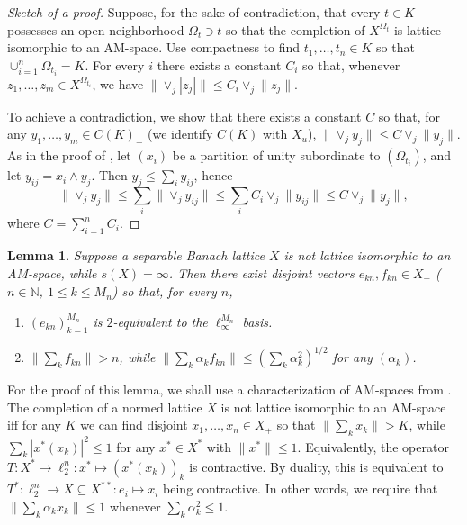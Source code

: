 \documentclass[12pt,leqno]{amsart}
\newtheorem{lemma}[theorem]{Lemma}
\numberwithin{equation}{section}
\theoremstyle{definition}
\def\N{{\mathbb N}}
\begin{document}
\begin{proof}[Sketch of a proof]
Suppose, for the sake of contradiction, that every $t \in K$ possesses an open neighborhood $\Omega_t \ni t$ so that the completion of $X^{\Omega_t}$ is lattice isomorphic to an AM-space. Use compactness to find $t_1, \ldots, t_n \in K$ so that $\cup_{i=1}^n \Omega_{t_i} = K$. For every $i$ there exists a constant $C_i$ so that, whenever $z_1, \ldots, z_m \in X^{\Omega_{t_i}}$, we have $\|\vee_j |z_j|\| \leq C_i \vee_j \|z_j\|$.
\medskip

To achieve a contradiction, we show that there exists a constant $C$ so that, for any $y_1, \ldots, y_m \in C(K)_+$ (we identify $C(K)$ with $X_u$), $\| \vee_j y_j\| \leq C \vee_j \|y_j\|$. As in the proof of , let $(x_i)$ be a partition of unity subordinate to $(\Omega_{t_i})$, and let $y_{ij} = x_i \wedge y_j$. Then $y_j \leq \sum_i y_{ij}$, hence
$$
\big\| \vee_j y_j\big\| \leq \sum_i \big\| \vee_j y_{ij}\big\| \leq \sum_i C_i \vee_j \|y_{ij}\| \leq C \vee_j \|y_j\| ,
$$
where $C = \sum_{i=1}^n C_i$.
\end{proof}

\begin{lemma}\label{l:just_right_bases}
 Suppose a separable Banach lattice $X$ is not lattice isomorphic to an AM-space, while $s(X) = \infty$.
 Then there exist disjoint vectors $e_{kn}, f_{kn} \in X_+$ ($n \in \N$, $1 \leq k \leq M_n$) so that, for every $n$,
 \begin{enumerate}
  \item $(e_{kn})_{k=1}^{M_n}$ is $2$-equivalent to the $\ell_\infty^{M_n}$ basis.
  \item $\| \sum_k f_{kn} \| > n$, while $\| \sum_k \alpha_k f_{kn} \| \leq ( \sum_k \alpha_k^2 )^{1/2}$ for any $(\alpha_k)$.
 \end{enumerate}
\end{lemma}

For the proof of this lemma, we shall use a characterization of AM-spaces from \cite[Lemma 4]{CL}.
The completion of a normed lattice $X$ is not lattice isomorphic to an AM-space iff for any $K$ we can find disjoint $x_1, \ldots, x_n \in X_+$ so that $\|\sum_k x_k\| > K$, while $\sum_k | x^*(x_k) |^2 \leq 1$ for any $x^* \in X^*$ with $\|x^*\| \leq 1$.
Equivalently,  the operator $T : X^* \to \ell_2^n : x^* \mapsto (x^*(x_k))_k$ is contractive. By duality, this is equivalent to $T^* : \ell_2^n \to X \subseteq X^{**} : e_i \mapsto x_i$ being contractive. In other words, we require that  $\| \sum_k \alpha_k x_k \| \leq 1$ whenever $\sum_k \alpha_k^2 \leq 1$.
\end{document}
